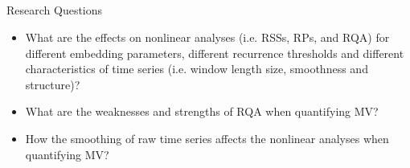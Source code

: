 %
%


%
%


\subsection{}
{
\begin{frame}{Research Questions}

\large
\begin{itemize}
	\item What are the effects on nonlinear analyses
	(i.e. RSSs, RPs, and RQA) for 
	different embedding parameters, 
	different recurrence thresholds and 
	different characteristics of time series 
	(i.e. window length size, smoothness and structure)?
	\item What are the weaknesses and strengths of RQA when
	quantifying MV?
	\item How the smoothing of raw time series affects the nonlinear
	analyses when quantifying MV?
\end{itemize}
\end{frame}
}




